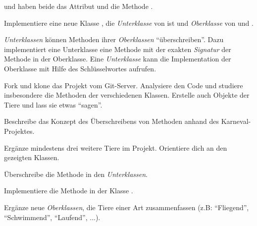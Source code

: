 \documentclass[9pt, a4paper]{arbeitsblatt}
\begin{document}
\begin{enumn}[resume*]
	\item {} und  haben beide das Attribut  und die Methode .

	Implementiere eine neue Klasse , die \emph{Unterklasse} von  ist und \emph{Oberklasse} von  und .
\end{enumn}

\newpage
\emph{Unterklassen} können Methoden ihrer \emph{Oberklassen} \enquote{überschreiben}. Dazu implementiert eine Unterklasse eine Methode mit der exakten \emph{Signatur} der Methode in der Oberklasse. Eine \emph{Unterklasse} kann die Implementation der Oberklasse mit Hilfe des Schlüsselwortes  aufrufen.

\begin{enumn}[resume*]
	\item Fork und klone das Projekt  vom Git-Server. Analysiere den Code und studiere insbesondere die  Methoden der verschiedenen Klassen. Erstelle auch Objekte der Tiere und lass sie etwas \enquote{sagen}.

	\begin{smallenum}
		\item Beschreibe das Konzept des Überschreibens von Methoden anhand des Karneval-Projektes.
		\item Ergänze mindestens drei weitere Tiere im Projekt. Orientiere dich an den gezeigten Klassen.
		\item Überschreibe die Methode  in den \emph{Unterklassen}.
		\item Implementiere die Methode  in der Klasse .
		\item Ergänze neue \emph{Oberklassen}, die Tiere einer Art zusammenfassen (z.B: \enquote{Fliegend}, \enquote{Schwimmend}, \enquote{Laufend}, ...).
	\end{smallenum}
\end{enumn}
\end{document}
